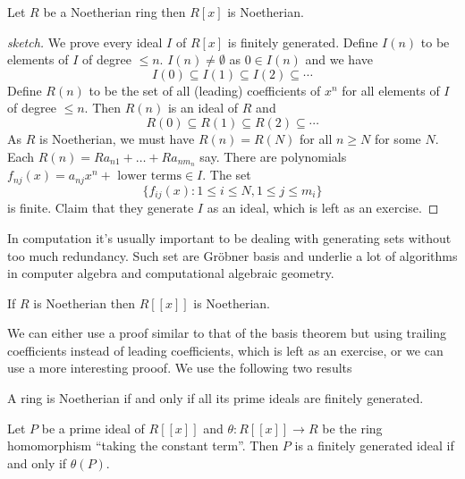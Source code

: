 \documentclass[a4paper]{article}
\begin{document}
\begin{theorem}
  Let \(R\) be a Noetherian ring then \(R[x]\) is Noetherian.
\end{theorem}

\begin{proof}[sketch]
  We prove every ideal \(I\) of \(R[x]\) is finitely generated. Define \(I(n)\) to be elements of \(I\) of degree \(\leq n\). \(I(n) \neq \emptyset\) as \(0 \in I(n)\) and we have
  \[
    I(0) \subseteq I(1) \subseteq I(2) \subseteq \cdots
  \]
  Define \(R(n)\) to be the set of all (leading) coefficients of \(x^n\) for all elements of \(I\) of degree \(\leq n\). Then \(R(n)\) is an ideal of \(R\) and
  \[
    R(0) \subseteq R(1) \subseteq R(2) \subseteq \cdots
  \]
  As \(R\) is Noetherian, we must have \(R(n) = R(N)\) for all \(n \geq N\) for some \(N\). Each \(R(n) = R a_{n1} + \dots + R a_{n m_n}\) say. There are polynomials \(f_{nj}(x) = a_{nj} x^n + \text{ lower terms} \in I\). The set
  \[
    \{f_{ij}(x): 1 \leq i \leq N, 1 \leq j \leq m_i\}
  \]
  is finite. Claim that they generate \(I\) as an ideal, which is left as an exercise.
\end{proof}

\begin{remark}
  In computation it's usually important to be dealing with generating sets without too much redundancy. Such set are Gröbner basis and underlie a lot of algorithms in computer algebra and computational algebraic geometry.
\end{remark}

\begin{theorem}
  If \(R\) is Noetherian then \(R[[x]]\) is Noetherian.
\end{theorem}

We can either use a proof similar to that of the basis theorem but using trailing coefficients instead of leading coefficients, which is left as an exercise, or we can use a more interesting prooof. We use the following two results

\begin{theorem}[Cohn]
  \label{thm:Cohn}
  A ring is Noetherian if and only if all its prime ideals are finitely generated. 
\end{theorem}

\begin{lemma}
  \label{lem:prime ideals of R[[x]]}
  Let \(P\) be a prime ideal of \(R[[x]]\) and \(\theta: R[[x]] \to R\) be the ring homomorphism ``taking the constant term''. Then \(P\) is a finitely generated ideal if and only if \(\theta(P)\).
\end{lemma}
\end{document}
